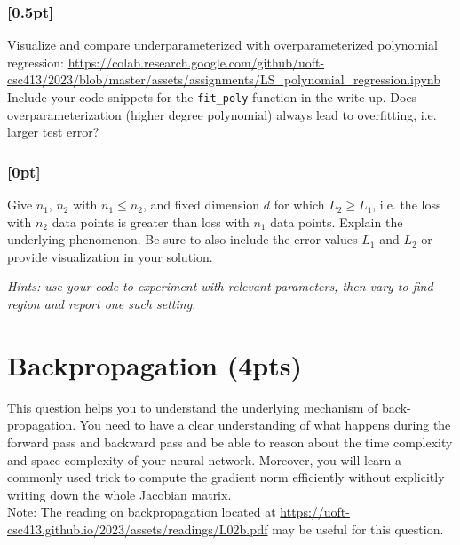 \subsubsection{{\color{blue}[0.5pt]} \LIV}
Visualize and compare underparameterized with overparameterized polynomial regression:
\url{https://colab.research.google.com/github/uoft-csc413/2023/blob/master/assets/assignments/LS_polynomial_regression.ipynb}
Include your code snippets for the \verb|fit_poly| function in the write-up. Does overparameterization (higher degree polynomial) always lead to overfitting, i.e. larger test error?

\subsubsection{[0pt] \LIV}
Give $n_1$, $n_2$ with $n_1 \leq n_2$, and fixed dimension $d$ for which $L_2 \geq L_1$, i.e. the loss with $n_2$ data points is greater than loss with $n_1$ data points. Explain the underlying phenomenon. Be sure to also include the error values $L_1$ and $L_2$ or provide visualization in your solution. 

\noindent \emph{Hints: use your code to experiment with relevant parameters, then vary to find region and report one such setting.}



\section{Backpropagation (4pts)} 
This question helps you to understand the underlying mechanism of back-propagation. You need to have a clear understanding of what happens during the forward pass and backward pass and be able to reason about the time complexity and space complexity of your neural network. Moreover, you will learn a commonly used trick to compute the gradient norm efficiently without explicitly writing down the whole Jacobian matrix.\\

\noindent Note: The reading on backpropagation located at \url{https://uoft-csc413.github.io/2023/assets/readings/L02b.pdf} may be useful for this question.

